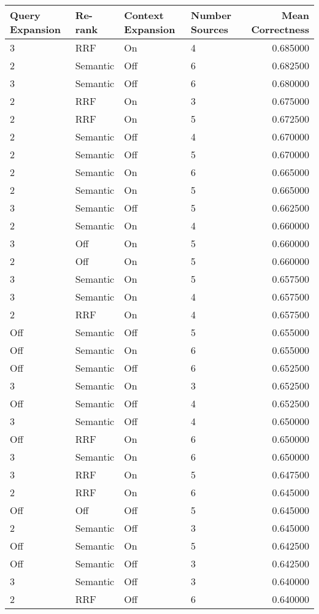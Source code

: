 \begin{tabular}{llllr}
\toprule
Query Expansion & Re-rank & Context Expansion & Number Sources & Mean Correctness \\
\midrule
3 & RRF & On & 4 & 0.685000 \\
2 & Semantic & Off & 6 & 0.682500 \\
3 & Semantic & Off & 6 & 0.680000 \\
2 & RRF & On & 3 & 0.675000 \\
2 & RRF & On & 5 & 0.672500 \\
2 & Semantic & Off & 4 & 0.670000 \\
2 & Semantic & Off & 5 & 0.670000 \\
2 & Semantic & On & 6 & 0.665000 \\
2 & Semantic & On & 5 & 0.665000 \\
3 & Semantic & Off & 5 & 0.662500 \\
2 & Semantic & On & 4 & 0.660000 \\
3 & Off & On & 5 & 0.660000 \\
2 & Off & On & 5 & 0.660000 \\
3 & Semantic & On & 5 & 0.657500 \\
3 & Semantic & On & 4 & 0.657500 \\
2 & RRF & On & 4 & 0.657500 \\
Off & Semantic & Off & 5 & 0.655000 \\
Off & Semantic & On & 6 & 0.655000 \\
Off & Semantic & Off & 6 & 0.652500 \\
3 & Semantic & On & 3 & 0.652500 \\
Off & Semantic & Off & 4 & 0.652500 \\
3 & Semantic & Off & 4 & 0.650000 \\
Off & RRF & On & 6 & 0.650000 \\
3 & Semantic & On & 6 & 0.650000 \\
3 & RRF & On & 5 & 0.647500 \\
2 & RRF & On & 6 & 0.645000 \\
Off & Off & Off & 5 & 0.645000 \\
2 & Semantic & Off & 3 & 0.645000 \\
Off & Semantic & On & 5 & 0.642500 \\
Off & Semantic & Off & 3 & 0.642500 \\
3 & Semantic & Off & 3 & 0.640000 \\
2 & RRF & Off & 6 & 0.640000 \\

\end{tabular}
